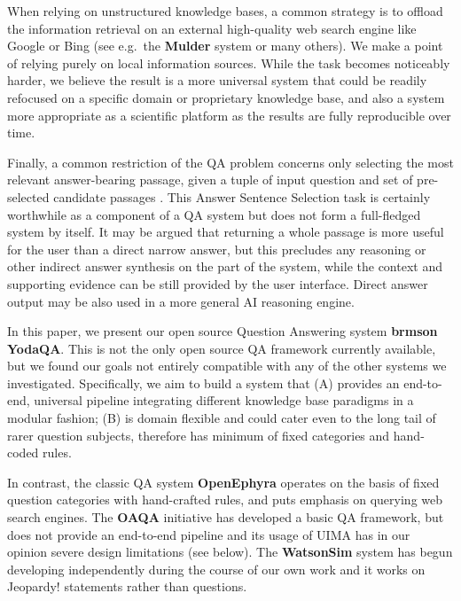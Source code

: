 \documentclass{poster15}
\begin{document}
When relying on unstructured knowledge bases, a common strategy is to offload
the information retrieval on an external high-quality web search engine
like Google or Bing (see e.g.\ the \textbf{Mulder} system \cite{MulderKwok}
or many others).
We make a point of relying purely on local information sources.
While the task becomes noticeably harder,
we believe the result is a more
universal system that could be readily refocused on a specific domain
or proprietary knowledge base, and also a system more appropriate as
a scientific platform as the results are fully reproducible over time.

Finally, a common restriction of the QA problem concerns only selecting
the most relevant answer-bearing passage, given a tuple of input question
and set of pre-selected candidate passages \cite{WangQAGrammar}.
This Answer Sentence Selection task is certainly
worthwhile as a component of a QA system but does not form a full-fledged
system by itself.
It may be argued that returning a whole passage is more useful for the user than a direct narrow answer,
but this precludes any reasoning or other indirect answer synthesis on the part of the system,
while the context and supporting evidence can be still provided by the user interface.
Direct answer output may be also used in a more general AI reasoning engine.

In this paper, we present our open source Question Answering system
\textbf{brmson YodaQA}.  This is not the only open source QA framework
currently available, but we found our goals not entirely compatible
with any of the other systems we investigated.
Specifically, we aim to build a system that
(A) provides an end-to-end, universal pipeline integrating different
knowledge base paradigms in a modular fashion;
(B) is domain flexible and could cater even to the long tail of rarer
question subjects, therefore has minimum of fixed categories and hand-coded rules.

In contrast, the classic QA system \textbf{OpenEphyra} \cite{Ephyra2006}
operates on the basis of fixed question categories with hand-crafted rules,
and puts emphasis on querying web search engines.
The \textbf{OAQA} initiative \cite{OAQATowards} has developed a basic QA framework,
but does not provide an end-to-end pipeline and its usage of UIMA has
in our opinion severe design limitations (see below).
The \textbf{WatsonSim} system \cite{WatsonSim} has begun developing independently
during the course of our own work and it works on Jeopardy! statements rather
than questions.
\end{document}
